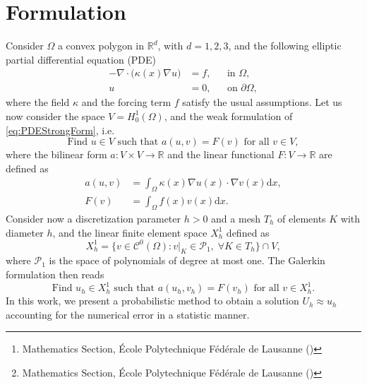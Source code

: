 \documentclass{siamart1116}
\title{{\TheTitle}}
\author{Assyr Abdulle\thanks{Mathematics Section, \'Ecole Polytechnique F\'ed\'erale de Lausanne (\email{assyr.abdulle@epfl.ch})}
	\and
	Giacomo Garegnani\thanks{Mathematics Section, \'Ecole Polytechnique F\'ed\'erale de Lausanne (\email{giacomo.garegnani@epfl.ch})}}
\numberwithin{theorem}{section}
\newcommand{\R}{\mathbb{R}}
\newcommand{\dd}{\mathrm{d}}
\begin{document}
	
\maketitle	

\section{Formulation} Consider $\Omega$ a convex polygon in $\R^d$, with $d = 1, 2, 3$, and the following elliptic partial differential equation (PDE)
\begin{equation}\label{eq:PDEStrongForm}
\begin{aligned}
	-\nabla \cdot\big(\kappa(x) \nabla u\big) &= f, && \text{in } \Omega,\\
	 u &= 0, && \text{on } \partial\Omega,
\end{aligned}
\end{equation}
where the field $\kappa$ and the forcing term $f$ satisfy the usual assumptions. Let us now consider the space $V = H_0^1(\Omega)$, and the weak formulation of \eqref{eq:PDEStrongForm}, i.e.
\begin{equation}
	\text{Find } u \in V \text{ such that } a(u,v) = F(v) \text{ for all } v \in V,
\end{equation}
where the bilinear form $a\colon V\times V \to \R$ and the linear functional $F\colon V \to \R$ are defined as
\begin{equation}
\begin{split}
	a(u, v) &= \int_{\Omega} \kappa(x) \nabla u(x) \cdot \nabla v(x) \dd x ,\\
	F(v) &= \int_{\Omega} f(x) v(x) \dd x.
\end{split}
\end{equation}
Consider now a discretization parameter $h > 0$ and a mesh $T_h$ of elements $K$ with diameter $h$, and the linear finite element space $X^1_h$ defined as
\begin{equation}
	X^1_h = \{v \in \mathcal{C}^0(\Omega) \colon v|_{K} \in \mathcal{P}_1, \; \forall K \in T_h\} \cap V,
\end{equation}
where $\mathcal{P}_1$ is the space of polynomials of degree at most one. The Galerkin formulation then reads
\begin{equation}
	\text{Find } u_h \in X^1_h \text{ such that } a(u_h,v_h) = F(v_h) \text{ for all } v \in X^1_h.
\end{equation}
In this work, we present a probabilistic method to obtain a solution $U_h \approx u_h$ accounting for the numerical error in a statistic manner.
\end{document}
